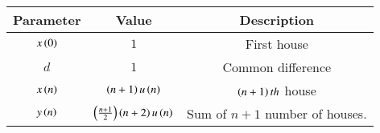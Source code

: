 \begin{tabular}{|c|c|c|}
\hline
Parameter & Value & Description \\
\hline
$x\left(0\right)$ & $1$ & First house \\
\hline
$d$ & $1$ & Common difference\\
\hline
$x\left(n\right)$ & $\left(n+1\right)u\left(n\right)$ & $\left(n+1\right)th$ house\\
\hline
$y\left(n\right)$ & $\left(\frac{n+1}{2}\right)\left(n+2\right)u\left(n\right)$ & Sum of $n+1$ number of houses.\\
\hline
\end{tabular}
